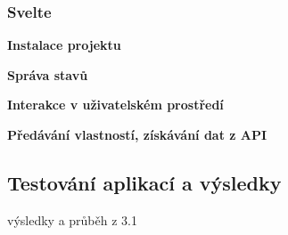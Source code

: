 \subsubsection{Svelte}

\begin{flushleft}
  \textbf{Instalace projektu}
\end{flushleft}

\begin{flushleft}
  \textbf{Správa stavů}
\end{flushleft}

\begin{flushleft}
  \textbf{Interakce v uživatelském prostředí}
\end{flushleft}

\begin{flushleft}
  \textbf{Předávání vlastností, získávání dat z API}
\end{flushleft}


\subsection{Testování aplikací a výsledky}

\begin{citemize}
	\item výsledky a průběh z 3.1
\end{citemize}

